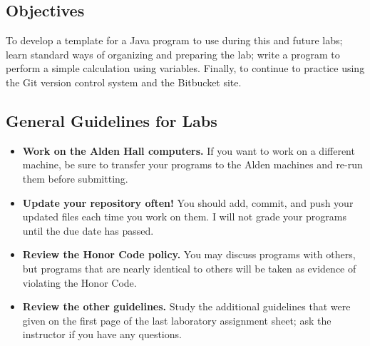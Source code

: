 


\vspace*{-.25in}

\subsection*{Objectives}

To develop a template for a Java program to use during this and future labs; learn standard ways of organizing and
preparing the lab; write a program to perform a simple calculation using variables. Finally, to continue to practice
using the Git version control system and the Bitbucket site.

\vspace*{-.1in}

\subsection*{General Guidelines for Labs}

\begin{itemize}

\setlength\itemsep{.2em}

\item {\bf Work on the Alden Hall computers.} If you want to work on a different machine, be sure to transfer your
  programs to the Alden machines and re-run them before submitting.

\item {\bf Update your repository often!} You should add, commit, and push your updated files each time you work on
  them.  I will not grade your programs until the due date has passed.

\item {\bf Review the Honor Code policy.} You may discuss programs with others, but programs that are nearly identical
  to others will be taken as evidence of violating the Honor Code.

\item {\bf Review the other guidelines.} Study the additional guidelines that were given on the first page of the last
  laboratory assignment sheet; ask the instructor if you have any questions.

\end{itemize}

\vspace*{-.2in}


